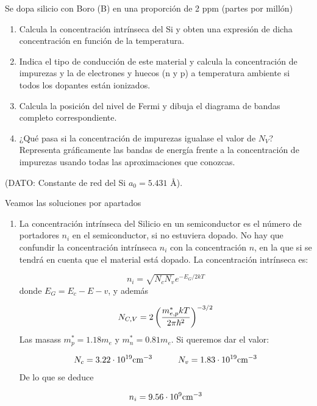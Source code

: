 \begin{texercise}
	Se dopa silicio con Boro (B) en una proporción de 2 ppm (partes por millón)
	\begin{enumerate}[label=\alph*)]
		\item Calcula la concentración intrínseca del Si y obten una expresión de dicha concentración en función de la temperatura.
		\item Indica el tipo de conducción de este material y calcula la concentración de impurezas y la de electrones y huecos (n y p) a temperatura ambiente si todos los dopantes están ionizados.
		\item Calcula la posición del nivel de Fermi y dibuja el diagrama de bandas completo correspondiente.
		\item ¿Qué pasa si la concentración de impurezas igualase el valor de \( N_V \)? Representa gráficamente las bandas de energía frente a la concentración de impurezas usando todas las aproximaciones que conozcas.
	\end{enumerate}
	(DATO: Constante de red del Si \( a_0 = 5.431 \) Å).

	\tcblower
	Veamos las soluciones por apartados
	\begin{enumerate}[label=\alph*)]
		\item La concentración intrínseca del Silicio en un semiconductor es el número de portadores $n_i$ en el semiconductor, si no estuviera dopado. No hay que confundir la concentración intrínseca $n_i$ con la concentración $n$, en la que si se tendrá en cuenta que el material está dopado. La concentración intrínseca es:

		      \begin{equation}
			      n_i = \sqrt{N_cN_v} e^{-E_G/2kT}
		      \end{equation}
		      donde $E_G=E_c-E-v$, y además

		      \begin{equation}
			      N_{C,V} = 2 \left( \frac{m_{e,p}^* kT}{2\pi\hbar^2} \right)^{-3/2}
		      \end{equation}
		      Las masass $m_p^*= 1.18m_e$ y $m_n^*=0.81m_e$. Si queremos dar el valor:

		      \begin{equation}
			      N_c = 3.22 \cdot 10^{19} \text{cm}^{-3} \quad \quad \quad 	N_v = 1.83 \cdot 10^{19} \text{cm}^{-3}
		      \end{equation}
		      De lo que se deduce

		      \begin{equation}
			      n_i = 9.56 \cdot 10^9 \text{cm}^{-3}
		      \end{equation}



\end{enumerate}
\end{texercise}
